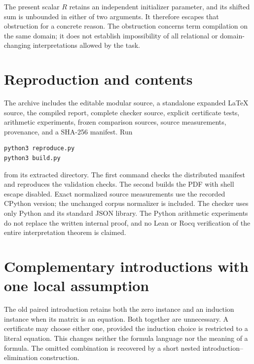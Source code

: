 \documentclass[11pt,letterpaper]{article}
\theoremstyle{definition}\newtheorem{definition}[theorem]{Definition}
\theoremstyle{remark}\newtheorem{remark}[theorem]{Remark}
\begin{document}
The present scalar $R$ retains an independent initializer parameter,
and its shifted sum is unbounded in either of two arguments. It therefore
escapes that obstruction for a concrete reason. The obstruction concerns
term compilation on the same domain; it does not establish impossibility
of all relational or domain-changing interpretations allowed by the task.

\section{Reproduction and contents}

The archive includes the editable modular source, a standalone expanded
\LaTeX{} source, the compiled report, complete checker source, explicit
certificate tests, arithmetic experiments, frozen comparison sources,
source measurements, provenance, and a SHA-256 manifest. Run
\begin{lstlisting}
python3 reproduce.py
python3 build.py
\end{lstlisting}
from its extracted directory. The first command checks the distributed
manifest and reproduces the validation checks. The second builds the PDF
with shell escape disabled. Exact normalized source measurements use the
recorded CPython version; the unchanged corpus normalizer is included.
The checker uses only Python and its standard JSON library. The Python
arithmetic experiments do not replace the written internal proof, and no
Lean or Rocq verification of the entire interpretation theorem is claimed.

\appendix

\section{Complementary introductions with one local assumption}
\label{sec:choice-introduction}

The old paired introduction retains both the zero instance and an
induction instance when its matrix is an equation. Both together are
unnecessary. A certificate may choose either one, provided the induction
choice is restricted to a literal equation. This changes neither the
formula language nor the meaning of a formula. The omitted combination
is recovered by a short nested introduction--elimination construction.
\end{document}
